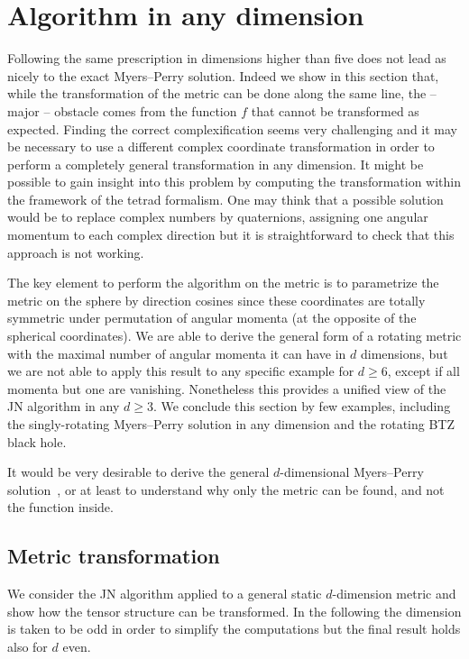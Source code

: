\section{Algorithm in any dimension}
\label{sec:higher}


Following the same prescription in dimensions higher than five does not lead as nicely to the exact Myers--Perry solution.
Indeed we show in this section that, while the transformation of the metric can be done along the same line, the -- major -- obstacle comes from the function $f$ that cannot be transformed as expected.
Finding the correct complexification seems very challenging and it may be necessary to use a different complex coordinate transformation in order to perform a completely general transformation in any dimension.
It might be possible to gain insight into this problem by computing the transformation within the framework of the tetrad formalism.
One may think that a possible solution would be to replace complex numbers by quaternions, assigning one angular momentum to each complex direction but it is straightforward to check that this approach is not working.

The key element to perform the algorithm on the metric is to parametrize the metric on the sphere by direction cosines since these coordinates are totally symmetric under permutation of angular momenta (at the opposite of the spherical coordinates).
We are able to derive the general form of a rotating metric with the maximal number of angular momenta it can have in $d$ dimensions, but we are not able to apply this result to any specific example for $d \ge 6$, except if all momenta but one are vanishing.
Nonetheless this provides a unified view of the JN algorithm in any $d \ge 3$.
We conclude this section by few examples, including the singly-rotating Myers--Perry solution in any dimension and the rotating BTZ black hole.

It would be very desirable to derive the general $d$-dimensional Myers--Perry solution~\cite{Myers:1986:BlackHolesHigher}, or at least to understand why only the metric can be found, and not the function inside.


\subsection{Metric transformation}
\label{sec:higher-jna:any-dimension}


We consider the JN algorithm applied to a general static $d$-dimension metric and show how the tensor structure can be transformed.
In the following the dimension is taken to be odd in order to simplify the computations but the final result holds also for $d$ even.



